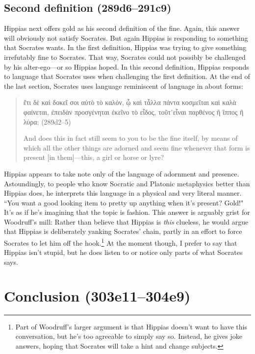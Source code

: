 \documentclass[11pt]{article}
\begin{document}

\subsection{Second definition (289d6--291c9)}

Hippias next offers gold as his second definition of the fine.  Again, this answer will obviously not satisfy Socrates.  But again Hippias is responding to something that Socrates wants.  In the first definition, Hippias was trying to give something irrefutably fine to Socrates.  That way, Socrates could not possibly be challenged by his alter-ego---or so Hippias hoped.  In this second definition, Hippias responds to language that Socrates uses when challenging the first definition. At the end of the last section, Socrates uses language reminiscent of language in  about forms:

\begin{quote}
    ἔτι δὲ καὶ δοκεῖ σοι αὐτὸ τὸ καλόν, ᾧ καὶ τἆλλα πάντα κοσμεῖται καὶ καλὰ φαίνεται, ἐπειδὰν προσγένηται ἐκεῖνο τὸ εἶδος, τοῦτ᾽εἶναι παρθένος ἢ ἵππος ἢ λύρα; (289d2--5)

    And does this in fact still seem to you to be the fine itself, by means of which all the other things are adorned and seem fine whenever that form is present [in them]---this, a girl or horse or lyre?
\end{quote}

Hippias appears to take note only of the language of adornment and presence.  Astoundingly, to people who know Socratic and Platonic metaphysics better than Hippias does, he interprets this language in a physical and very literal manner.  ``You want a good looking item to pretty up anything when it's present?  Gold!"  It's as if he's imagining that the topic is fashion.  This answer is arguably grist for Woodruff's mill: Rather than believe that Hippias is \emph{this} clueless, he would argue that Hippias is deliberately yanking Socrates' chain, partly in an effort to force Socrates to let him off the hook.\footnote{Part of Woodruff's larger argument is that Hippias doesn't want to have this conversation, but he's too agreeable to simply say so.  Instead, he gives joke answers, hoping that Socrates will take a hint and change subjects.}  At the moment though, I prefer to say that Hippias isn't stupid, but he does listen to or notice only parts of what Socrates says.


\section{Conclusion (303e11--304e9)}




\newpage


\end{document}
